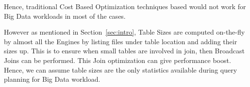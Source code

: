 Hence, traditional Cost Based Optimization techniques based would not work for Big Data workloads in most of the cases.

However as mentioned in Section~\ref{sec:intro}, Table Sizes are computed on-the-fly by almost all the Engines by listing files under table location and adding their sizes up. This is to ensure when small tables are involved in join, then Broadcast Joins can be performed. This Join optimization can give performance boost. Hence, we can assume table sizes are the only statistics available during query planning for Big Data workload.


